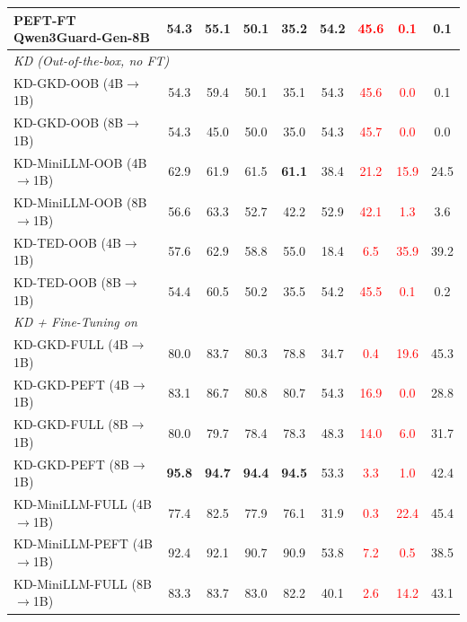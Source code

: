\begin{table}[t]
\begin{tabular}{lcccccccc}
PEFT-FT Qwen3Guard-Gen-8B                  & 54.3 & 55.1 & 50.1 & 35.2 & 54.2 & \textcolor{red}{45.6} & \textcolor{red}{0.1} & 0.1 \\
\midrule
\multicolumn{9}{l}{\textit{KD (Out-of-the-box, no FT)}} \\
KD-GKD-OOB (4B$\rightarrow$1B)             & 54.3 & 59.4 & 50.1 & 35.1 & 54.3 & \textcolor{red}{45.6} & \textcolor{red}{0.0} & 0.1 \\
KD-GKD-OOB (8B$\rightarrow$1B)             & 54.3 & 45.0 & 50.0 & 35.0 & 54.3 & \textcolor{red}{45.7} & \textcolor{red}{0.0} & 0.0 \\
KD-MiniLLM-OOB (4B$\rightarrow$1B)         & 62.9 & 61.9 & 61.5 & \textbf{61.1} & 38.4 & \textcolor{red}{21.2} & \textcolor{red}{15.9} & 24.5 \\
KD-MiniLLM-OOB (8B$\rightarrow$1B)         & 56.6 & 63.3 & 52.7 & 42.2 & 52.9 & \textcolor{red}{42.1} & \textcolor{red}{1.3} & 3.6 \\
KD-TED-OOB (4B$\rightarrow$1B)             & 57.6 & 62.9 & 58.8 & 55.0 & 18.4 & \textcolor{red}{6.5} & \textcolor{red}{35.9} & 39.2 \\
KD-TED-OOB (8B$\rightarrow$1B)             & 54.4 & 60.5 & 50.2 & 35.5 & 54.2 & \textcolor{red}{45.5} & \textcolor{red}{0.1} & 0.2 \\
\midrule
\multicolumn{9}{l}{\textit{KD + Fine-Tuning on \dataset{}}} \\
KD-GKD-FULL (4B$\rightarrow$1B)            & 80.0 & 83.7 & 80.3 & 78.8 & 34.7 & \textcolor{red}{0.4} & \textcolor{red}{19.6} & 45.3 \\
KD-GKD-PEFT (4B$\rightarrow$1B)            & 83.1 & 86.7 & 80.8 & 80.7 & 54.3 & \textcolor{red}{16.9} & \textcolor{red}{0.0} & 28.8 \\
KD-GKD-FULL (8B$\rightarrow$1B)            & 80.0 & 79.7 & 78.4 & 78.3 & 48.3 & \textcolor{red}{14.0} & \textcolor{red}{6.0} & 31.7 \\
KD-GKD-PEFT (8B$\rightarrow$1B)            & \textbf{95.8} & \textbf{94.7} & \textbf{94.4} & \textbf{94.5} & 53.3 & \textcolor{red}{3.3} & \textcolor{red}{1.0} & 42.4 \\
KD-MiniLLM-FULL (4B$\rightarrow$1B)        & 77.4 & 82.5 & 77.9 & 76.1 & 31.9 & \textcolor{red}{0.3} & \textcolor{red}{22.4} & 45.4 \\
KD-MiniLLM-PEFT (4B$\rightarrow$1B)        & 92.4 & 92.1 & 90.7 & 90.9 & 53.8 & \textcolor{red}{7.2} & \textcolor{red}{0.5} & 38.5 \\
KD-MiniLLM-FULL (8B$\rightarrow$1B)        & 83.3 & 83.7 & 83.0 & 82.2 & 40.1 & \textcolor{red}{2.6} & \textcolor{red}{14.2} & 43.1 \\

\end{tabular}
\end{table}
